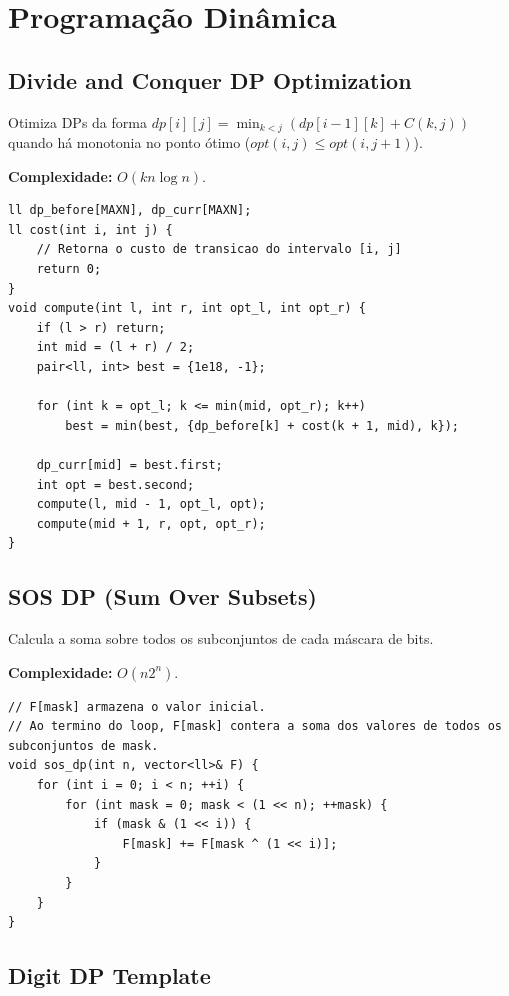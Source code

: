 \section{Programação Dinâmica}



\subsection{Divide and Conquer DP Optimization}

Otimiza DPs da forma $dp[i][j] = \min_{k < j} (dp[i-1][k] + C(k, j))$ quando há monotonia no ponto ótimo ($opt(i, j) \le opt(i, j+1)$).

\textbf{Complexidade:} $O(k n \log n)$.

\begin{lstlisting}
ll dp_before[MAXN], dp_curr[MAXN];
ll cost(int i, int j) {
    // Retorna o custo de transicao do intervalo [i, j]
    return 0; 
}
void compute(int l, int r, int opt_l, int opt_r) {
    if (l > r) return;
    int mid = (l + r) / 2;
    pair<ll, int> best = {1e18, -1};

    for (int k = opt_l; k <= min(mid, opt_r); k++) 
        best = min(best, {dp_before[k] + cost(k + 1, mid), k});

    dp_curr[mid] = best.first;
    int opt = best.second;
    compute(l, mid - 1, opt_l, opt);
    compute(mid + 1, r, opt, opt_r);
}
\end{lstlisting}


\subsection{SOS DP (Sum Over Subsets)}

Calcula a soma sobre todos os subconjuntos de cada máscara de bits.

\textbf{Complexidade:} $O(n 2^n)$.

\begin{lstlisting}
// F[mask] armazena o valor inicial. 
// Ao termino do loop, F[mask] contera a soma dos valores de todos os subconjuntos de mask.
void sos_dp(int n, vector<ll>& F) {
    for (int i = 0; i < n; ++i) {
        for (int mask = 0; mask < (1 << n); ++mask) {
            if (mask & (1 << i)) {
                F[mask] += F[mask ^ (1 << i)];
            }
        }
    }
}
\end{lstlisting}


\subsection{Digit DP Template}

